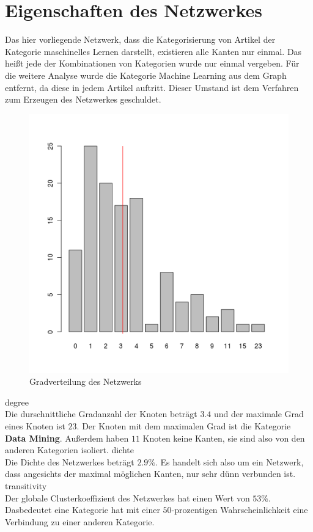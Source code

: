 \documentclass{acm_proc_article-sp}
\begin{document}
\section{Eigenschaften des Netzwerkes}
Das hier vorliegende Netzwerk, dass die Kategorisierung von Artikel der Kategorie maschinelles Lernen darstellt, existieren alle Kanten nur einmal. Das heißt jede der Kombinationen von Kategorien wurde nur einmal vergeben.
Für die weitere Analyse wurde die Kategorie Machine Learning aus dem Graph entfernt, da diese in jedem Artikel auftritt. Dieser Umstand ist dem Verfahren zum Erzeugen des Netzwerkes geschuldet.
\begin{figure}[H]
\centering
\includegraphics[scale=0.35]{../visualization/degree_hist.png}
\caption{Gradverteilung des Netzwerks}
\end{figure}
degree\\
Die durschnittliche Gradanzahl der Knoten beträgt $3.4$ und der maximale Grad eines Knoten ist $23$. Der Knoten mit dem maximalen Grad ist die Kategorie \textbf{Data Mining}. Außerdem haben $11$ Knoten keine Kanten, sie sind also von den anderen Kategorien isoliert.
dichte\\
Die Dichte des Netzwerkes beträgt $2.9\%$. Es handelt sich also um ein Netzwerk, dass angesichts der maximal möglichen Kanten, nur sehr dünn verbunden ist.
transitivity\\
Der globale Clusterkoeffizient des Netzwerkes hat einen Wert von $53\%$. Dasbedeutet eine Kategorie hat mit einer $50$-prozentigen Wahrscheinlichkeit eine Verbindung zu einer anderen Kategorie.
\end{document}
